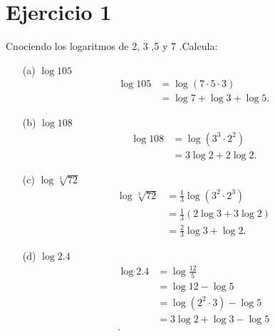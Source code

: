 \documentclass{article}
\begin{document}
\section*{Ejercicio 1}
Cnociendo los logaritmos de 2, 3 ,5 y 7 .Calcula:
\begin{itemize}
    \item[(a)] \( \log 105 \)
        \begin{align*}
            \log 105 &= \log ( 7 \cdot 5 \cdot 3)\\
            &= \log 7 + \log 3 + \log 5
        .\end{align*}
    \item[(b)] \( \log 108 \)
        \begin{align*}
            \log 108 &= \log ( 3^3 \cdot 2^2)\\
            &= 3 \log 2 + 2 \log 2
        .\end{align*}
    \item[(c)] \( \log \sqrt[3]{72}  \)
        \begin{align*}
            \log \sqrt[3]{72} &= \frac{1}{3} \log ( 3^2 \cdot 2^3) \\
            &= \frac{1}{3}\left( 2 \log 3 + 3 \log 2  \right)  \\
            &= \frac{2}{3} \log 3 + \log 2
        .\end{align*}
    \item[(d)] \( \log 2.4\)
        \begin{align*}
            \log 2.4& = \log \frac{12}{5}\\
            &= \log 12 - \log 5 \\
            &= \log ( 2^2 \cdot 3) - \log 5 \\
            &= 3\log 2 + \log 3  - \log 5 \\
        .\end{align*}
\end{itemize}
\end{document}

